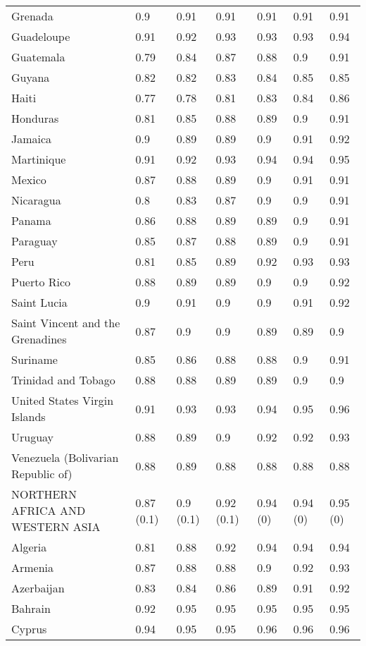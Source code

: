 \begin{longtable}[t]{lllllll}
Grenada & 0.9 & 0.91 & 0.91 & 0.91 & 0.91 & 0.91\\
Guadeloupe & 0.91 & 0.92 & 0.93 & 0.93 & 0.93 & 0.94\\
Guatemala & 0.79 & 0.84 & 0.87 & 0.88 & 0.9 & 0.91\\
Guyana & 0.82 & 0.82 & 0.83 & 0.84 & 0.85 & 0.85\\
Haiti & 0.77 & 0.78 & 0.81 & 0.83 & 0.84 & 0.86\\
Honduras & 0.81 & 0.85 & 0.88 & 0.89 & 0.9 & 0.91\\
Jamaica & 0.9 & 0.89 & 0.89 & 0.9 & 0.91 & 0.92\\
Martinique & 0.91 & 0.92 & 0.93 & 0.94 & 0.94 & 0.95\\
Mexico & 0.87 & 0.88 & 0.89 & 0.9 & 0.91 & 0.91\\
Nicaragua & 0.8 & 0.83 & 0.87 & 0.9 & 0.9 & 0.91\\
Panama & 0.86 & 0.88 & 0.89 & 0.89 & 0.9 & 0.91\\
Paraguay & 0.85 & 0.87 & 0.88 & 0.89 & 0.9 & 0.91\\
Peru & 0.81 & 0.85 & 0.89 & 0.92 & 0.93 & 0.93\\
Puerto Rico & 0.88 & 0.89 & 0.89 & 0.9 & 0.9 & 0.92\\
Saint Lucia & 0.9 & 0.91 & 0.9 & 0.9 & 0.91 & 0.92\\
Saint Vincent and the Grenadines & 0.87 & 0.9 & 0.9 & 0.89 & 0.89 & 0.9\\
Suriname & 0.85 & 0.86 & 0.88 & 0.88 & 0.9 & 0.91\\
Trinidad and Tobago & 0.88 & 0.88 & 0.89 & 0.89 & 0.9 & 0.9\\
United States Virgin Islands & 0.91 & 0.93 & 0.93 & 0.94 & 0.95 & 0.96\\
Uruguay & 0.88 & 0.89 & 0.9 & 0.92 & 0.92 & 0.93\\
Venezuela (Bolivarian Republic of) & 0.88 & 0.89 & 0.88 & 0.88 & 0.88 & 0.88\\
NORTHERN AFRICA AND WESTERN ASIA & 0.87 (0.1) & 0.9 (0.1) & 0.92 (0.1) & 0.94 (0) & 0.94 (0) & 0.95 (0)\\
Algeria & 0.81 & 0.88 & 0.92 & 0.94 & 0.94 & 0.94\\
Armenia & 0.87 & 0.88 & 0.88 & 0.9 & 0.92 & 0.93\\
Azerbaijan & 0.83 & 0.84 & 0.86 & 0.89 & 0.91 & 0.92\\
Bahrain & 0.92 & 0.95 & 0.95 & 0.95 & 0.95 & 0.95\\
Cyprus & 0.94 & 0.95 & 0.95 & 0.96 & 0.96 & 0.96\\

\end{longtable}
